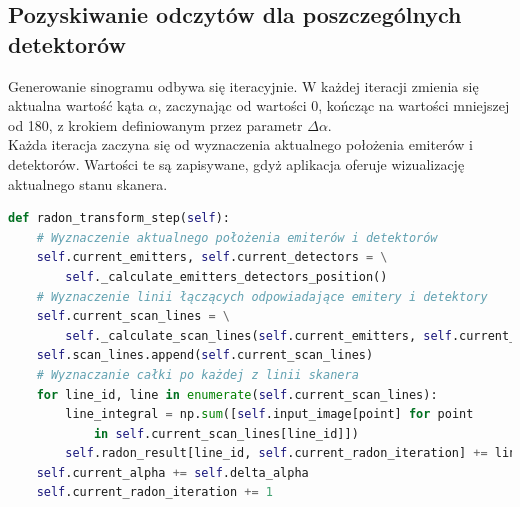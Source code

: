 \documentclass[a4paper]{article}
\begin{document}
\subsection{Pozyskiwanie odczytów dla poszczególnych detektorów}
Generowanie sinogramu odbywa się iteracyjnie. W każdej iteracji zmienia się aktualna wartość kąta $\alpha$, zaczynając od wartości 0\degree, kończąc na wartości mniejszej od 180\degree, z krokiem definiowanym przez parametr $\Delta\alpha$. \\
Każda iteracja zaczyna się od wyznaczenia aktualnego położenia emiterów i detektorów. Wartości te są zapisywane, gdyż aplikacja oferuje wizualizację aktualnego stanu skanera.
\begin{lstlisting}[language=Python, caption=Krok transformaty Radona, texcl=true]
def radon_transform_step(self):
    # Wyznaczenie aktualnego położenia emiterów i detektorów
    self.current_emitters, self.current_detectors = \
        self._calculate_emitters_detectors_position()
    # Wyznaczenie linii łączących odpowiadające emitery i detektory
    self.current_scan_lines = \
        self._calculate_scan_lines(self.current_emitters, self.current_detectors)
    self.scan_lines.append(self.current_scan_lines)
    # Wyznaczanie całki po każdej z linii skanera
    for line_id, line in enumerate(self.current_scan_lines):
        line_integral = np.sum([self.input_image[point] for point 
            in self.current_scan_lines[line_id]])
        self.radon_result[line_id, self.current_radon_iteration] += line_integral
    self.current_alpha += self.delta_alpha
    self.current_radon_iteration += 1
\end{lstlisting}
\pagebreak
\end{document}
